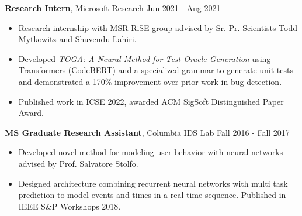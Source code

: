 \documentclass{article} %
\newcommand{\rjob}[2]{
  \hspace*{-0.3cm}
{\fontsize{10pt}{12pt}\selectfont #1} \hfill #2
\vspace*{0.1cm}
\hspace*{-1.2cm}
}
\newenvironment{ritemize}{
\hspace*{-0.8cm}
\begin{minipage}{1.05\linewidth}
\begin{itemize}
}{
\end{itemize}
\end{minipage}
}
\newcommand{\ritem}{
\item[-]
}
\begin{document}
\rjob{\textbf{Research Intern}, Microsoft Research}{Jun 2021 - Aug 2021}\\
\begin{ritemize}
    \ritem Research internship with MSR RiSE group advised by Sr. Pr. Scientists Todd Mytkowitz and Shuvendu Lahiri.
    \ritem Developed \textit{TOGA: A Neural Method for Test Oracle Generation} using Transformers (CodeBERT) and a specialized grammar to generate unit tests and demonstrated a 170\% improvement over prior work in bug detection.
    \ritem Published work in ICSE 2022, awarded ACM SigSoft Distinguished Paper Award.
\end{ritemize}

\rjob{\textbf{MS Graduate Research Assistant}, Columbia IDS Lab}{Fall 2016 - Fall 2017}\\
\begin{ritemize}
  \ritem Developed novel method for modeling user behavior with neural networks advised by Prof. Salvatore Stolfo.
  \ritem Designed architecture combining recurrent neural networks with multi task prediction to model events and times in a real-time sequence. Published in IEEE S\&P Workshops 2018.
\end{ritemize}


\end{document}
